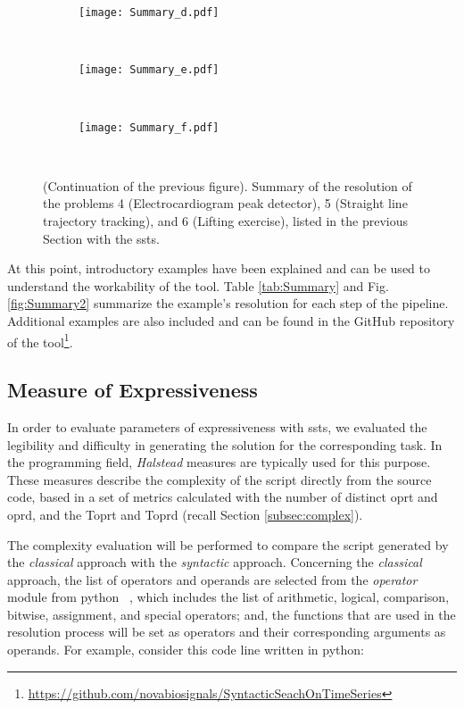 \begin{figure}
	\ContinuedFloat
    \begin{subfigure}{\textwidth}
    \texttt{[image: Summary\_d.pdf]}
    \caption{}
    \end{subfigure}\\	

    \begin{subfigure}{\textwidth}
    \texttt{[image: Summary\_e.pdf]}
    \caption{}
    \end{subfigure}	\\
    \begin{subfigure}{\textwidth}
    \texttt{[image: Summary\_f.pdf]}
    \caption{}
    \end{subfigure}\\
    \caption{(Continuation of the previous figure). Summary of the resolution of the problems 4 (Electrocardiogram peak detector), 5 (Straight line trajectory tracking), and 6 (Lifting exercise), listed in the previous Section with the \gls{ssts}.}
\end{figure}

At this point, introductory examples have been explained and can be used to understand the workability of the tool. Table \ref{tab:Summary} and Fig. \ref{fig:Summary2} summarize the example's resolution for each step of the pipeline. Additional examples are also included and can be found in the GitHub repository of the tool\footnote{\url{https://github.com/novabiosignals/SyntacticSeachOnTimeSeries}}.


\subsection{Measure of Expressiveness}

In order to evaluate parameters of expressiveness with \gls{ssts}, we evaluated the legibility and difficulty in generating the solution for the corresponding task. In the programming field, \textit{Halstead} measures are typically used for this purpose. These measures describe the complexity of the script directly from the source code, based in a set of metrics calculated with the number of distinct \gls{oprt} and \gls{oprd}, and the \gls{Toprt} and \gls{Toprd} (recall Section \ref{subsec:complex}).
\par
The complexity evaluation will be performed to compare the script generated by the \textit{classical} approach with the \textit{syntactic} approach. Concerning the \textit{classical} approach, the list of operators and operands are selected from the \textit{operator} module from python ~\cite{oprtPy}, which includes the list of arithmetic, logical, comparison, bitwise, assignment, and special operators; and, the functions that are used in the resolution process will be set as operators and their corresponding arguments as operands. For example, consider this code line written in python:

